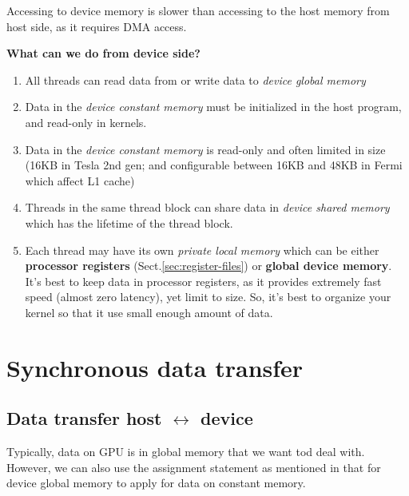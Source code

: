 Accessing to device memory is slower than accessing to the host memory
from host side, as it requires DMA access.

{\bf What can we do from device side?}
\begin{enumerate}
\item All threads can read data from or write data to
  {\it device global memory}
\item Data in the {\it device constant memory} must be initialized in
  the host program, and read-only in kernels.
\item Data in the {\it device constant memory} is read-only and often
  limited in size (16KB in Tesla 2nd gen; and configurable between
  16KB and 48KB in Fermi which affect L1 cache)

\item Threads in the same thread block can share data in {\it device
    shared memory} which has the lifetime of the thread block.
\item Each thread may have its own {\it private local memory} which
  can be either {\bf processor registers} (Sect.\ref{sec:register-files}) or
  {\bf global device memory}. It's best to keep data in
  processor registers, as it provides extremely fast speed (almost zero
  latency), yet limit to size. So, it's best to organize your kernel so that it use small
  enough amount of data. 
\end{enumerate}

\section{Synchronous data transfer}
\label{sec:cudaf_synch_datacopy}

\subsection{Data transfer host $\leftrightarrow$ device}
\label{sec:data-transfer-host}


Typically, data on GPU is in global memory that we want tod deal with.
However, we can also use the assignment statement as mentioned in that for
device global memory to apply for data on constant memory.


